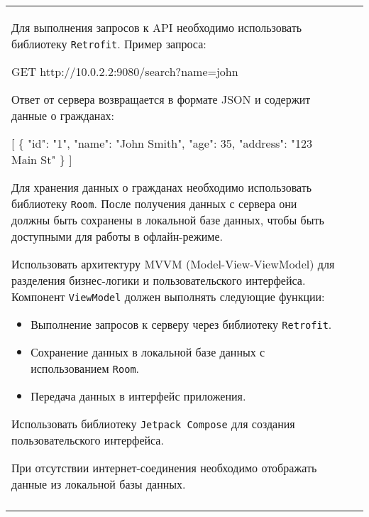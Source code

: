 \documentclass[a4paper]{article}
\begin{document}
\begin{tabular}{!{\vrule width 2pt}p{5cm}|p{6cm}|p{4cm}!{\vrule width 2pt}}
{\begin{minipage}{16cm}
\begin{enumerate}

Для выполнения запросов к API необходимо использовать библиотеку \texttt{Retrofit}. Пример запроса:


GET http://10.0.2.2:9080/search?name=john


Ответ от сервера возвращается в формате JSON и содержит данные о гражданах:


[
  \{
    "id": "1",
    "name": "John Smith",
    "age": 35,
    "address": "123 Main St"
  \}
]


Для хранения данных о гражданах необходимо использовать библиотеку \texttt{Room}. После получения данных с сервера они должны быть сохранены в локальной базе данных, чтобы быть доступными для работы в офлайн-режиме.

Использовать архитектуру MVVM (Model-View-ViewModel) для разделения бизнес-логики и пользовательского интерфейса. Компонент \texttt{ViewModel} должен выполнять следующие функции:
\begin{itemize}
    \item Выполнение запросов к серверу через библиотеку \texttt{Retrofit}.
    \item Сохранение данных в локальной базе данных с использованием \texttt{Room}.
    \item Передача данных в интерфейс приложения.
\end{itemize}

Использовать библиотеку \texttt{Jetpack Compose} для создания пользовательского интерфейса.

При отсутствии интернет-соединения необходимо отображать данные из локальной базы данных. 
\end{enumerate}

\vspace{0.2cm}
    
\end{minipage}
}
\\
\end{tabular}
\end{document}
